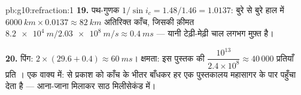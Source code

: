 \begin{solution}{pb:g10:refraction:1}
\textbf{19.} पथ-गुणक $1/\sin i_c = 1.48/1.46 = 1.0137$: बुरे से बुरे हाल में $\qty{6000}{km} \times 0.0137 \approx \qty{82}{km}$ अतिरिक्त
काँच, जिसकी क़ीमत $\qty{8.2e4}{m} / \qty{2.03e8}{m/s} \approx \qty{0.4}{ms}$ --- यानी टेढ़ी-मेढ़ी चाल लगभग मुफ़्त है।

\textbf{20.} पिंग: $2 \times (29.6 + 0.4) \approx \qty{60}{ms}$। क्षमता: इस पुस्तक की $\dfrac{10^{13}}{2.4 \times 10^8} \approx 40\,000$ प्रतियाँ
प्रति । एक वाक्य में:  से प्रकाश को
काँच के भीतर बाँधकर  हर  एक पुस्तकालय
महासागर के पार पहुँचा देता है --- आना-जाना मिलाकर साठ मिलीसेकंड में।
\end{solution}
